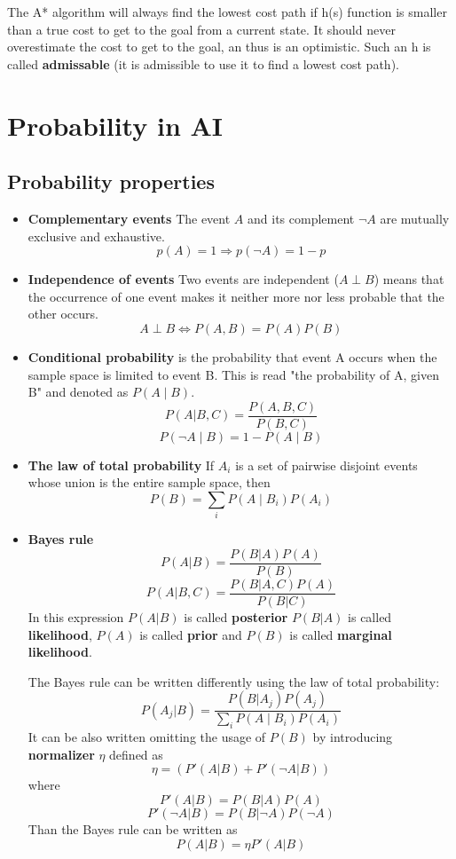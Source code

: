 \documentclass[a4paper,10pt]{article}
\begin{document}
The A* algorithm will always find the lowest cost path if h(s) function is smaller than a true cost to get to the goal from a current state. It should never overestimate the cost to get to the goal, an thus is an  optimistic. Such an h is called \textbf{admissable} (it is admissible to use it to find a lowest cost path). 

\section{Probability in AI}

\subsection{Probability properties}
\begin{itemize}
\item \textbf{Complementary events} The event $A$ and its complement $\neg A$ are mutually exclusive and exhaustive.
\[p(A) = 1 \Rightarrow p(\neg A) = 1-p \]
\item \textbf{Independence of events} Two events are independent ($A\perp B$) means that the occurrence of one event makes it neither more nor less probable that the other occurs.
\[ A\perp B \Leftrightarrow P(A,B) = P(A)P(B) \]
\item \textbf{Conditional probability} is the probability that event A occurs when the sample space is limited to event B. This is read "the probability of A, given B" and denoted as $P(A\mid B)$.
\[P(A|B,C) = \frac{P(A,B,C)}{P(B,C)} \]
\[P(\neg A\mid B) = 1-P(A \mid B) \]
\item \textbf{The law of total probability}
If $A_i$ is a set of pairwise disjoint events whose union is the entire sample space, then
\[P(B) = \sum_{i} P(A \mid B_i)P(A_i) \]
\item \textbf{Bayes rule}
\[ P(A|B) = \frac{P(B|A)P(A)}{P(B)} \]
\[ P(A|B,C) = \frac{P(B|A,C)P(A)}{P(B|C)} \]
In this expression $P(A|B)$ is called \textbf{posterior} $P(B|A)$ is called \textbf{likelihood}, $P(A)$ is called \textbf{prior} and $P(B)$ is called \textbf{marginal likelihood}. 

The Bayes rule can be written differently using the law of total probability:
\[ P(A_j|B) = \frac{P(B|A_j)P(A_j)}{\sum_{i} P(A \mid B_i)P(A_i)} \]
It can be also written omitting the usage of $P(B)$ by introducing \textbf{normalizer} $\eta$ defined as
\[ \eta =(P'(A|B)+P'(\neg A|B)) \]
where
\[ P'(A|B) = P(B|A)P(A) \]
\[ P'(\neg A|B) = P(B|\neg A)P(\neg A)\]
Than the Bayes rule can be written as
\[ P(A|B) = \eta P'(A|B) \]


\end{itemize}
\end{document}
